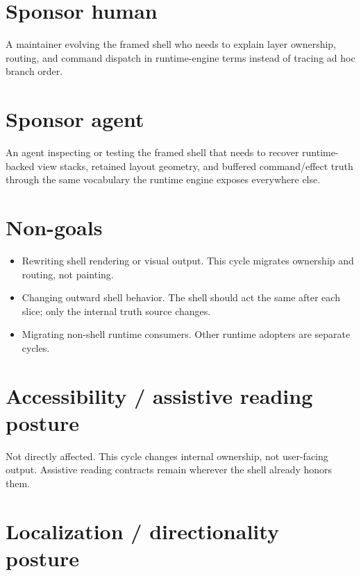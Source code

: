 \section{Sponsor human}\label{record-155-sponsor-human}

A maintainer evolving the framed shell who needs to explain layer ownership, routing, and command dispatch in runtime-engine terms instead of tracing ad hoc branch order.

\section{Sponsor agent}\label{record-155-sponsor-agent}

An agent inspecting or testing the framed shell that needs to recover runtime-backed view stacks, retained layout geometry, and buffered command/effect truth through the same vocabulary the runtime engine exposes everywhere else.

\section{Non-goals}\label{record-155-non-goals}

\begin{itemize}
\tightlist
\item
  Rewriting shell rendering or visual output. This cycle migrates ownership and routing, not painting.
\item
  Changing outward shell behavior. The shell should act the same after each slice; only the internal truth source changes.
\item
  Migrating non-shell runtime consumers. Other runtime adopters are separate cycles.
\end{itemize}

\section{Accessibility / assistive reading posture}\label{record-155-accessibility-assistive-reading-posture}

Not directly affected. This cycle changes internal ownership, not user-facing output. Assistive reading contracts remain wherever the shell already honors them.

\section{Localization / directionality posture}\label{record-155-localization-directionality-posture}

